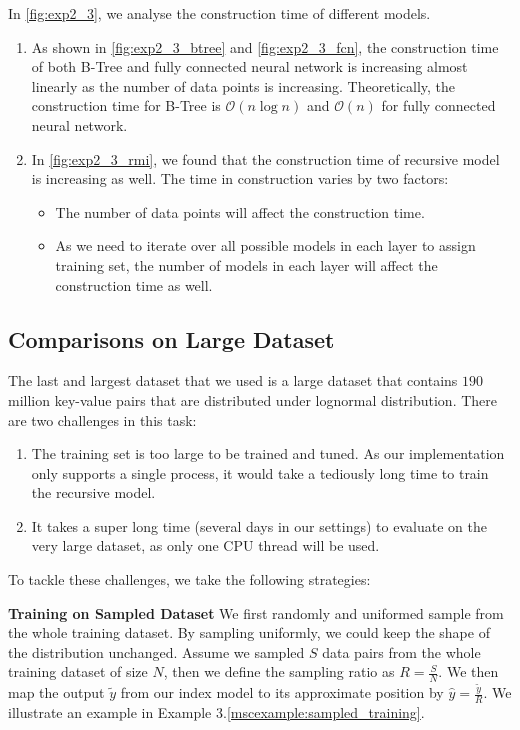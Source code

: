 \begin{mscconclusion}
	In \ref{fig:exp2_3}, we analyse the construction time of different models.
	\begin{enumerate}
		\item As shown in \ref{fig:exp2_3_btree} and \ref{fig:exp2_3_fcn}, the construction time of both B-Tree and fully connected neural network is increasing almost linearly as the number of data points is increasing. Theoretically, the construction time for B-Tree is $\mathcal{O}(n\log n)$ and $\mathcal{O}(n)$ for fully connected neural network.
		\item In \ref{fig:exp2_3_rmi}, we found that the construction time of recursive model is increasing as well. The time in construction varies by two factors:
			\begin{itemize}
				\item The number of data points will affect the construction time.
				\item As we need to iterate over all possible models in each layer to assign training set, the number of models in each layer will affect the construction time as well.
			\end{itemize}
	\end{enumerate}
\end{mscconclusion}

\subsection{Comparisons on Large Dataset} The last and largest dataset that we used is a large dataset that contains $190$ million key-value pairs that are distributed under lognormal distribution. There are two challenges in this task:

\begin{enumerate}
	\item The training set is too large to be trained and tuned. As our implementation only supports a single process, it would take a tediously long time to train the recursive model.
	\item It takes a super long time (several days in our settings) to evaluate on the very large dataset, as only one CPU thread will be used.
\end{enumerate}

To tackle these challenges, we take the following strategies:

\textbf{Training on Sampled Dataset} We first randomly and uniformed sample from the whole training dataset. By sampling uniformly, we could keep the shape of the distribution unchanged. Assume we sampled $S$ data pairs from the whole training dataset of size $N$, then we define the sampling ratio as $R=\frac{S}{N}$. We then map the output $\tilde{y}$ from our index model to its approximate position by $\hat{y}=\frac{\tilde{y}}{R}$. We illustrate an example in Example 3.\ref{mscexample:sampled_training}.

